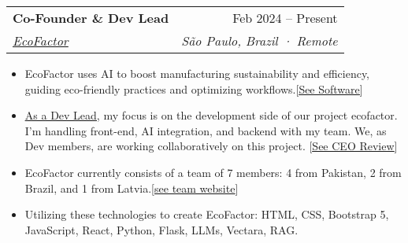 \documentclass[letterpaper,11pt]{article}
\makeatletter
\newcommand{\resumeItem}[1]{
  \item\small{
    {#1 \vspace{-2pt}}
  }
}
\newcommand{\resumeSubheading}[4]{
  \vspace{-2pt}\item
    \begin{tabular*}{0.97\textwidth}[t]{l@{\extracolsep{\fill}}r}
      \textbf{#1} & #2 \\
      \textit{\small#3} & \textit{\small #4} \\
    \end{tabular*}\vspace{-7pt}
}
\newcommand{\resumeItemListStart}{\begin{itemize}}
\newcommand{\resumeItemListEnd}{\end{itemize}\vspace{-5pt}}
\makeatother
\begin{document}
\resumeSubheading
{Co-Founder \& Dev Lead}{Feb 2024 -- Present}
{{\href{https://www.linkedin.com/company/ecofactorai/}{\underline{EcoFactor}}}}{São Paulo, Brazil · Remote}
\resumeItemListStart
\resumeItem{EcoFactor uses AI to boost manufacturing sustainability and efficiency, guiding eco-friendly practices and optimizing workflows.[{\href{https://www.linkedin.com/feed/update/urn:li:activity:7172699152647110656/}{\underline{See Software}}}]}
\resumeItem{{\href{https://www.linkedin.com/posts/ahmad-jajja_devabrteamabrlead-activity-7177855675555790848-Al_O?utm_source=share&utm_medium=member_desktop}{\underline{As a Dev Lead}}}, my focus is on the development side of our project ecofactor. I'm handling front-end, AI integration, and backend with my team. We, as Dev members, are working collaboratively on this project.}[{\href{https://www.linkedin.com/posts/ahmad-jajja_im-glad-i-could-contribute-to-the-project-activity-7172135900829605888-TSOY?utm_source=share&utm_medium=member_desktop}{\underline{See CEO Review}}}]
\resumeItem{EcoFactor currently consists of a team of 7 members: 4 from Pakistan, 2 from Brazil, and 1 from Latvia.[{\href{https://ecofactorsite.netlify.app/}{\underline{see team website}}}]}
\resumeItem{Utilizing these technologies to create EcoFactor: HTML, CSS, Bootstrap 5, JavaScript, React, Python, Flask, LLMs, Vectara, RAG.}
\resumeItemListEnd
\end{document}
